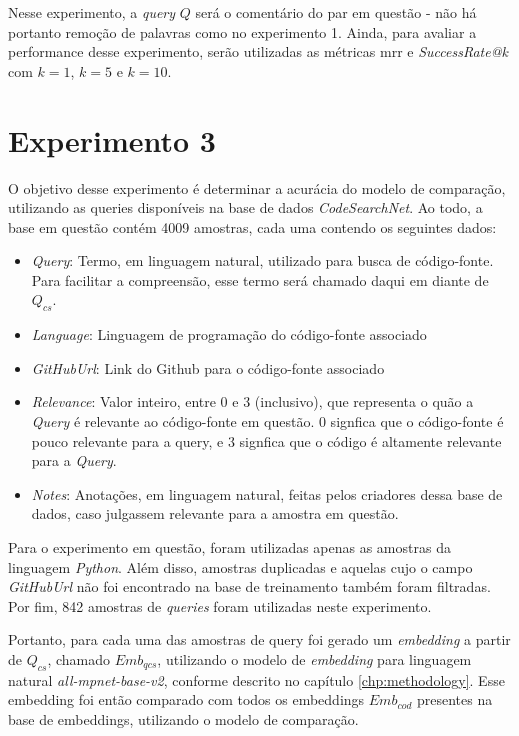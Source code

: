 Nesse experimento, a \textit{query} $Q$ será o comentário do par em questão - não há portanto remoção de palavras como no experimento 1. Ainda, para avaliar a performance desse experimento, serão utilizadas as métricas \gls{mrr} e \textit{SuccessRate@k} com $k=1$, $k=5$ e $k=10$.

\section{Experimento 3}
\label{sec:experiments:experiment-3}
O objetivo desse experimento é determinar a acurácia do modelo de comparação, utilizando as queries disponíveis na base de dados \textit{CodeSearchNet}. Ao todo, a base em questão contém 4009 amostras, cada uma contendo os seguintes dados:

\begin{itemize}
    \item \textit{Query}: Termo, em linguagem natural, utilizado para busca de código-fonte. Para facilitar a compreensão, esse termo será chamado daqui em diante de $Q_{cs}$.
    \item \textit{Language}: Linguagem de programação do código-fonte associado
    \item \textit{GitHubUrl}: Link do Github para o código-fonte associado
    \item \textit{Relevance}: Valor inteiro, entre 0 e 3 (inclusivo), que representa o quão a \textit{Query} é relevante ao código-fonte em questão. 0 signfica que o código-fonte é pouco relevante para a query, e 3 signfica que o código é altamente relevante para a \textit{Query}.
    \item \textit{Notes}: Anotações, em linguagem natural, feitas pelos criadores dessa base de dados, caso julgassem relevante para a amostra em questão.
\end{itemize}

Para o experimento em questão, foram utilizadas apenas as amostras da linguagem \textit{Python}. Além disso, amostras duplicadas e aquelas cujo o campo \textit{GitHubUrl} não foi encontrado na base de treinamento também foram filtradas. Por fim, 842 amostras de \textit{queries} foram utilizadas neste experimento.

Portanto, para cada uma das amostras de query foi gerado um \textit{embedding} a partir de $Q_{cs}$, chamado $Emb_{qcs}$, utilizando o modelo de \textit{embedding} para linguagem natural \textit{all-mpnet-base-v2}, conforme descrito no capítulo \ref{chp:methodology}. Esse embedding foi então comparado com todos os embeddings $Emb_{cod}$ presentes na base de embeddings, utilizando o modelo de comparação.

